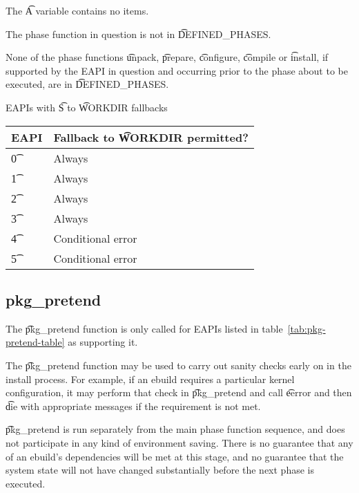 \begin{compactitem}
\item The \t{A} variable contains no items.
\item The phase function in question is not in \t{DEFINED\_PHASES}.
\item None of the phase functions \t{unpack}, \t{prepare}, \t{configure}, \t{compile} or \t{install},
    if supported by the EAPI in question and occurring prior to the phase about to be executed, are
    in \t{DEFINED\_PHASES}.
\end{compactitem}

\begin{centertable}{EAPIs with \t{S} to \t{WORKDIR} fallbacks} \label{tab:s-fallback-table}
    \begin{tabular}{ l l }
        \toprule
        \multicolumn{1}{c}{\textbf{EAPI}} &
        \multicolumn{1}{c}{\textbf{Fallback to \t{WORKDIR} permitted?}} \\
        \midrule
    \t{0} & Always \\
    \t{1} & Always \\
    \t{2} & Always \\
    \t{3} & Always \\
    \t{4} & Conditional error \\
    \t{5} & Conditional error \\
    \bottomrule
    \end{tabular}
\end{centertable}

\subsection{pkg\_pretend}
\label{sec:pkg-pretend-function}

 The \t{pkg\_pretend} function is only called for EAPIs listed in
table~\ref{tab:pkg-pretend-table} as supporting it.

The \t{pkg\_pretend} function may be used to carry out sanity checks early on in the install
process. For example, if an ebuild requires a particular kernel configuration, it may perform that
check in \t{pkg\_pretend} and call \t{eerror} and then \t{die} with appropriate messages if the
requirement is not met.

\t{pkg\_pretend} is run separately from the main phase function sequence, and does not participate
in any kind of environment saving. There is no guarantee that any of an ebuild's dependencies will
be met at this stage, and no guarantee that the system state will not have changed substantially
before the next phase is executed.

